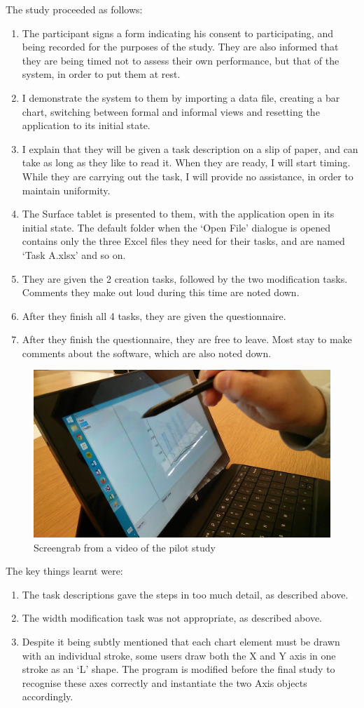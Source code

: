 The study proceeded as follows:
\begin{enumerate}
\item The participant signs a form indicating his consent to participating, and being recorded for the purposes of the study. They are also informed that they are being timed not to assess their own performance, but that of the system, in order to put them at rest.
\item I demonstrate the system to them by importing a data file, creating a bar chart, switching between formal and informal views and resetting the application to its initial state.
\item I explain that they will be given a task description on a slip of paper, and can take as long as they like to read it. When they are ready, I will start timing. While they are carrying out the task, I will provide no assistance, in order to maintain uniformity.
\item The Surface tablet is presented to them, with the application open in its initial state. The default folder when the `Open File' dialogue is opened contains only the three Excel files they need for their tasks, and are named `Task A.xlsx' and so on.
\item They are given the 2 creation tasks, followed by the two modification tasks. Comments they make out loud during this time are noted down. 
\item After they finish all 4 tasks, they are given the questionnaire.
\item After they finish the questionnaire, they are free to leave. Most stay to make comments about the software, which are also noted down.
\end{enumerate}

\begin{figure}[H]
\centering
\includegraphics[width=0.7\linewidth]{PilotStudy1}
\caption{Screengrab from a video of the pilot study}
\end{figure}


The key things learnt were:
\begin{enumerate}
\item The task descriptions gave the steps in too much detail, as described above.
\item The width modification task was not appropriate, as described above.
\item Despite it being subtly mentioned that each chart element must be drawn with an individual stroke, some users draw both the X and Y axis in one stroke as an `L' shape. The program is modified before the final study to recognise these axes correctly and instantiate the two Axis objects accordingly. 
\end{enumerate}

